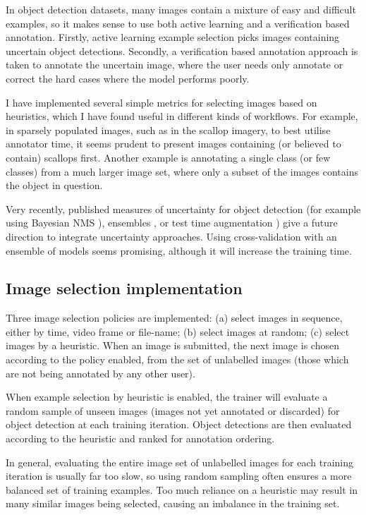In object detection datasets, many images contain a mixture of easy and difficult examples, so it makes sense to use both active learning and a verification based annotation.  Firstly, active learning example selection picks images containing uncertain object detections. Secondly, a verification based annotation approach is taken to annotate the uncertain image, where the user needs only annotate or correct the hard cases where the model performs poorly.

I have implemented several simple metrics for selecting images based on heuristics, which I have found useful in different kinds of workflows. For example, in sparsely populated images, such as in the scallop imagery, to best utilise annotator time, it seems prudent to present images containing (or believed to contain) scallops first. Another example is annotating a single class (or few classes) from a much larger image set, where only a subset of the images contains the object in question.

Very recently, published measures of uncertainty for object detection (for example using Bayesian \gls{NMS} \cite{Harakeh}), ensembles \cite{Le2018}, or test time augmentation \cite{Wei2018}) give a future direction to integrate uncertainty approaches. Using cross-validation with an ensemble of models seems promising, although it will increase the training time.

\subsection {Image selection implementation}
\label{sec:example_implementation}

Three image selection policies are implemented: (a) select images in sequence, either by time, video frame or file-name; (b) select images at random; (c) select images by a heuristic. When an image is submitted, the next image is chosen according to the policy enabled, from the set of unlabelled images (those which are not being annotated by any other user).

When example selection by heuristic is enabled, the trainer will evaluate a random sample of unseen images (images not yet annotated or discarded) for object detection at each training iteration. Object detections are then evaluated according to the heuristic and ranked for annotation ordering. 

In general, evaluating the entire image set of unlabelled images for each training iteration is usually far too slow, so using random sampling often ensures a more balanced set of training examples. Too much reliance on a heuristic may result in many similar images being selected, causing an imbalance in the training set.

